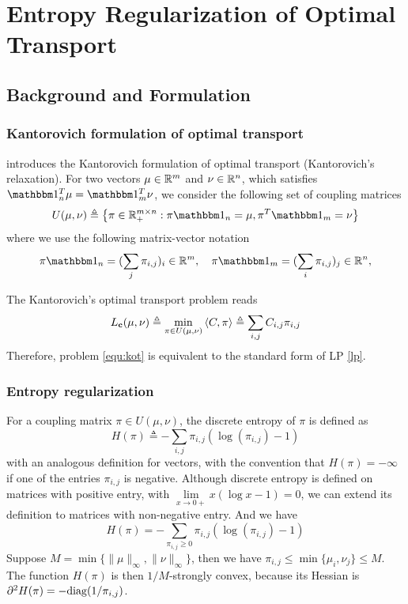 \section{Entropy Regularization of Optimal Transport}
\label{sec:3}
\subsection{Background and Formulation}
\subsubsection{Kantorovich formulation of optimal transport}
\cite{COT} introduces the Kantorovich formulation of optimal transport (Kantorovich's relaxation). For two vectors $\mu\in\mathbb{R}^m$ and $\nu\in\mathbb{R}^n$, which satisfies $\mbone_n^T\mu=\mbone_m^T\nu$, we consider the following set of coupling matrices
\begin{equation}
U(\mu, \nu) \triangleq \left\{\pi\in\mbR^{m\times n}_+: \pi\mbone_n = \mu, \pi^T\mbone_m=\nu \right\}
\end{equation}
where we use the following matrix-vector notation
$$
\pi\mbone_n  = (\sum_j \pi_{i,j})_i\in\mbR^m, \quad \pi\mbone_m  = (\sum_i \pi_{i,j})_j\in\mbR^n,
$$

The Kantorovich's optimal transport problem reads
\begin{equation}
\label{equ:kot}
L_{\mathbf{c}}(\mu,\nu)\triangleq \min\limits_{\pi\in U(\mu, \nu)}\left\langle C,\pi\right\rangle\triangleq\sum_{i,j}C_{i,j}\pi_{i,j}
\end{equation}
Therefore, problem \ref{equ:kot} is equivalent to the standard form of LP \ref{lp}. 

\subsubsection{Entropy regularization}
For a coupling matrix $\pi \in U(\mu, \nu)$, the discrete entropy of $\pi$ is defined as
\begin{equation}
H(\pi)\triangleq-\sum_{i,j}\pi_{i,j}(\log(\pi_{i,j})-1)
\end{equation}
with an analogous definition for vectors, with the convention that $H(\pi) = -\infty$ if one of the entries $\pi_{i,j}$ is negative. Although discrete entropy is defined on matrices with positive entry, with $\lim\limits_{x\to0+}x(\log x-1)=0$, we can extend its definition to  matrices with non-negative entry. And we have
$$
H(\pi)=-\sum_{\pi_{i,j}\geqslant0}\pi_{i,j}(\log(\pi_{i,j})-1)
$$
Suppose $M=\min\{\|\mu\|_\infty, \|\nu\|_\infty\}$, then we have $\pi_{i,j}\leqslant\min\{\mu_i, \nu_j\}\leqslant M$. The function $H(\pi)$ is then $1/M$-strongly convex, because its Hessian is $\partial^2H(\pi)=-\mathrm{diag}(1/\pi_{i,j})$. 

